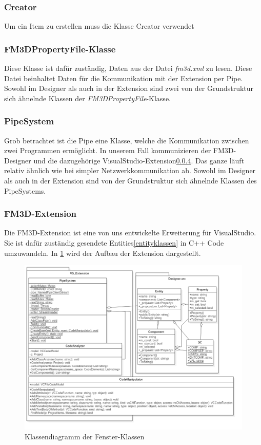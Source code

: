 \subsubsection{Creator}
Um ein Item zu erstellen muss die Klasse Creator verwendet 
\todo[inline]{!!!}
\subsubsection{FM3DPropertyFile-Klasse}
Diese Klasse ist dafür zuständig, Daten aus der Datei \textit{fm3d.xml} zu lesen. Diese Datei beinhaltet Daten für die Kommunikation mit der Extension per Pipe. Sowohl im Designer als auch in der Extension sind zwei von der Grundstruktur sich ähnelnde Klassen der \textit{FM3DPropertyFile}-Klasse.

\subsubsection{PipeSystem} 
\label{pipe}
Grob betrachtet ist die Pipe eine Klasse, welche die Kommunikation zwischen zwei Programmen ermöglicht. In unserem Fall kommunizieren der FM3D-Designer und die dazugehörige VisualStudio-Extension\ref{extension}. Das ganze läuft relativ ähnlich wie bei simpler Netzwerkkommunikation ab. 
Sowohl im Designer als auch in der Extension sind von der Grundstruktur sich ähnelnde Klassen des PipeSystems.

\subsubsection{FM3D-Extension}
\label{extension}
Die FM3D-Extension ist eine von uns entwickelte Erweiterung für VisualStudio. Sie ist dafür zuständig gesendete Entities\ref{entityklassen} in C++ Code umzuwandeln. In \cref{vsextensiondia} wird der Aufbau der Extension dargestellt.
\begin{figure}
	\begin{center}
		\includegraphics[width=\textwidth]{03unserprogramm/Designer/VSExtension.png}
		\caption{Klassendiagramm der Fenster-Klassen}\label{vsextensiondia}
	\end{center}
\end{figure}